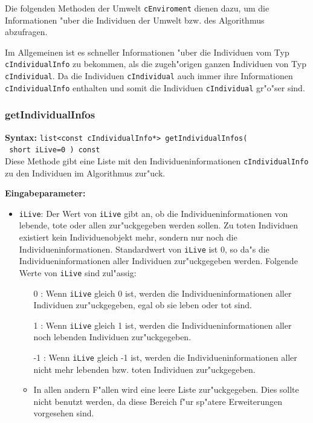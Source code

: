 Die folgenden Methoden der Umwelt \verb|cEnviroment| dienen dazu, um die Informationen "uber die Individuen der Umwelt bzw. des Algorithmus abzufragen.

Im Allgemeinen ist es schneller Informationen "uber die Individuen vom Typ \verb|cIndividualInfo| zu bekommen, als die zugeh"origen ganzen Individuen von Typ \verb|cIndividual|. Da die Individuen \verb|cIndividual| auch immer ihre Informationen \verb|cIndividualInfo| enthalten und somit die Individuen \verb|cIndividual| gr"o"ser sind.


\subsubsection{getIndividualInfos}

\textbf{Syntax:} \verb|list<const cIndividualInfo*> getIndividualInfos(| \\\verb| short iLive=0 ) const| \\

Diese Methode gibt eine Liste mit den Individueninformationen \verb|cIndividualInfo| zu den Individuen im Algorithmus zur"uck.

\bigskip\noindent
\textbf{Eingabeparameter:}
\begin{itemize}
 \item \verb|iLive|: Der Wert von \verb|iLive| gibt an, ob die Individueninformationen von lebende, tote oder allen zur"uckgegeben werden sollen. Zu toten Individuen existiert kein Individuenobjekt mehr, sondern nur noch die Individueninformationen. Standardwert von \verb|iLive| ist 0, so da"s die Individueninformationen aller Individuen zur"uckgegeben werden. Folgende Werte von \verb|iLive| sind zul"assig:
 \begin{itemize}
  \item [0]: Wenn \verb|iLive| gleich 0 ist, werden die Individueninformationen aller Individuen zur"uckgegeben, egal ob sie leben oder tot sind.
  \item [1]: Wenn \verb|iLive| gleich 1 ist, werden die Individueninformationen aller noch lebenden Individuen zur"uckgegeben.
  \item [-1]: Wenn \verb|iLive| gleich -1 ist, werden die Individueninformationen aller nicht mehr lebenden bzw. toten Individuen zur"uckgegeben.
  \item In allen andern F"allen wird eine leere Liste zur"uckgegeben. Dies sollte nicht benutzt werden, da diese Bereich f"ur sp"atere Erweiterungen vorgesehen sind.
 \end{itemize}
\end{itemize}

